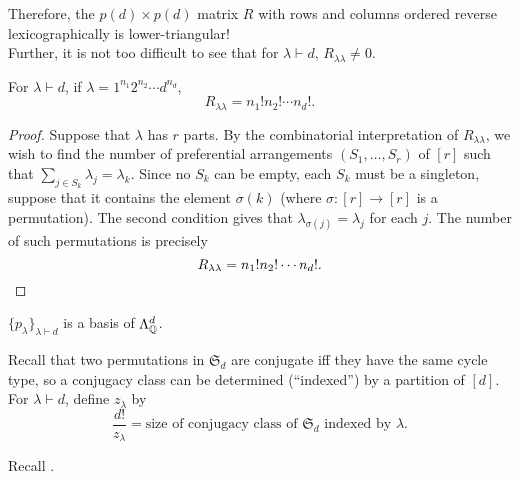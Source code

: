 	Therefore, the $p(d) \times p(d)$ matrix $R$ with rows and columns ordered reverse lexicographically is lower-triangular!\\
	Further, it is not too difficult to see that for $\lambda \vdash d$, $R_{\lambda\lambda} \ne 0$.
	
	\begin{prop}
		For $\lambda \vdash d$, if $\lambda = 1^{n_1}2^{n_2}\cdots d^{n_d}$,
		\[ R_{\lambda\lambda} = n_1! n_2! \cdots n_d!. \]
	\end{prop}
	\begin{proof}
		Suppose that $\lambda$ has $r$ parts. By the combinatorial interpretation of $R_{\lambda\lambda}$, we wish to find the number of preferential arrangements $(S_1,\ldots,S_r)$ of $[r]$ such that $\sum_{j \in S_k} \lambda_j = \lambda_k$. Since no $S_k$ can be empty, each $S_k$ must be a singleton, suppose that it contains the element $\sigma(k)$ (where $\sigma:[r]\to[r]$ is a permutation). The second condition gives that $\lambda_{\sigma(j)} = \lambda_j$ for each $j$. The number of such permutations is precisely
		\[ R_{\lambda\lambda} = n_1! n_2! \cdots n_d!. \qedhere \]
	\end{proof}

	\begin{fcor}
		$\{p_\lambda\}_{\lambda \vdash d}$ is a basis of $\Lambda_{\mathbb{Q}}^d$.
	\end{fcor}

	Recall that two permutations in $\mathfrak{S}_d$ are conjugate iff they have the same cycle type, so a conjugacy class can be determined (``indexed'') by a partition of $[d]$. For $\lambda \vdash d$, define $z_\lambda$ by
	\[ \frac{d!}{z_\lambda} = \text{size of conjugacy class of $\mathfrak{S}_d$ indexed by $\lambda$}. \]

	Recall .

